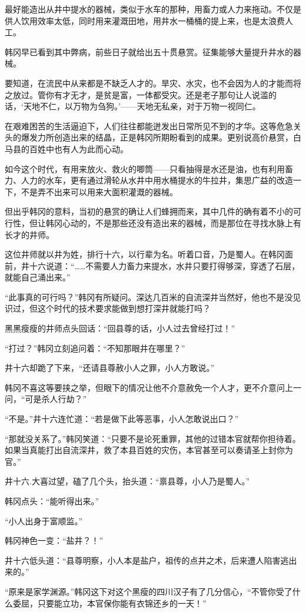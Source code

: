 最好能造出从井中提水的器械，类似于水车的那种，用畜力或人力来拖动。不仅是供人饮用效率太低，同时用来灌溉田地，用井水一桶桶的提上来，也是太浪费人工。

韩冈早已看到其中弊病，前些日子就给出五十贯悬赏。征集能够大量提升井水的器械。

要知道，在流民中从来都是不缺乏人才的。旱灾、水灾，也不会因为人的才能而将之放过。管你有才无才，是贫是富，一体都受灾。还是老子那句让人说滥的话，‘天地不仁，以万物为刍狗。’——天地无私亲，对于万物一视同仁。

在艰难困苦的生活逼迫下，人们往往都能迸发出日常所见不到的才华。这等危急关头的爆发力所创造出来的结晶，正是韩冈所期盼看到的成果。更别说高价悬赏，白马县的百姓中也有人为此而心动。

如今这个时代，有用来放火、救火的唧筒——只看抽得是水还是油，也有利用畜力、人力的水车，更有通过滑轮从水井中用水桶提水的牛拉井，集思广益的改造一下，不是弄不出来可以用来大面积灌溉的器械。

但出乎韩冈的意料，当初的悬赏的确让人们蜂拥而来，其中几件的确有着不小的可行性，但让韩冈心动的，不是那些还没有造出来的器械，而是那位在寻找水脉上有长才的井师。

这位井师就以井为姓，排行十六，以行辈为名。听着口音，乃是蜀人。在韩冈面前，井十六说道：“……不需要人力畜力来提水，水井只要打得够深，穿透了石层，就能自己涌出来。”

“此事真的可行吗？”韩冈有所疑问。深达几百米的自流深井当然好，他也不是没见识过，但这个时代的技术要求能做到想打深井就能打吗？

黑黑瘦瘦的井师点头回话：“回县尊的话，小人过去曾经打过！”

“打过？”韩冈立刻追问着：“不知那眼井在哪里？”

井十六却跪了下来，“还请县尊赦小人之罪，小人方敢说。”

韩冈不喜这等要挟之举，但眼下的情况让他不介意赦免一个人才，更不介意问上一问，“可是杀人行劫？”

“不是。”井十六连忙道：“若是做下此等恶事，小人怎敢说出口？”

“那就没关系了。”韩冈笑道：“只要不是论死重罪，其他的过错本官就帮你担待着。如果当真能打出自流深井，救了本县百姓的灾伤，本官甚至可以奏请圣上封你为官。”

井十六.大喜过望，磕了几个头，抬头道：“禀县尊，小人乃是蜀人。”

韩冈点头：“能听得出来。”

“小人出身于富顺监。”

韩冈神色一变：“盐井？！”

井十六低头道：“县尊明察，小人本是盐户，祖传的点井之术，后来遭人陷害逃出来的。”

“原来是家学渊源。”韩冈这下对这个黑瘦的四川汉子有了几分信心，“不管你受了什么委屈，只要能立功，本官保你能有衣锦还乡的一天！”

